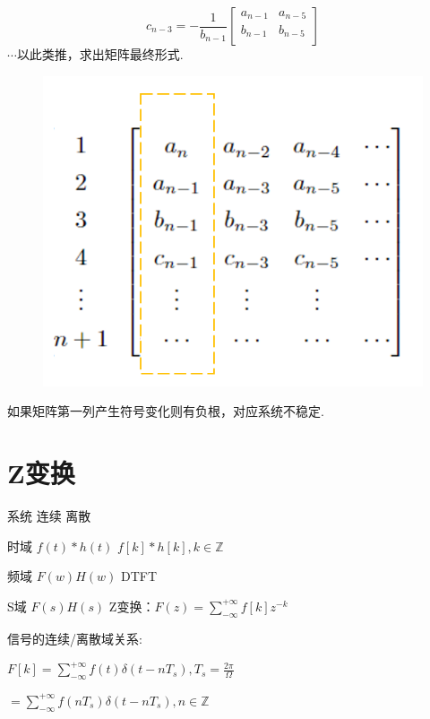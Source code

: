\documentclass[UTF8]{ctexart}
\begin{document}
\[c_{n-3}=-\frac{1}{b_{n-1}} \left[   
                \begin{matrix}
                a_{n-1} & a_{n-5} \\
                b_{n-1} & b_{n-5} \\
                \end{matrix}
                 \right]  \]
\qquad $\cdots $以此类推，求出矩阵最终形式.\par
\begin{figure}[h]
    \centering         %
    \includegraphics[scale=0.5]{2.png}
\end{figure}
如果矩阵第一列产生符号变化则有负根，对应系统不稳定.\par

\section{Z变换}
系统 \qquad 连续 \qquad  \qquad \qquad 离散 \par
时域 \qquad $f(t)\ast h(t)$ \qquad $f[k]\ast h[k],k\in \mathbb{Z}$  \par
频域 \qquad $F(w)H(w)$ \qquad DTFT \par
S域 \qquad $F(s)H(s)$ \qquad Z变换：$F(z)=\sum_{-\infty }^{+\infty} f[k]z^{-k} $ \par
信号的连续/离散域关系: \par
$F[k]=\sum_{-\infty }^{+\infty} f(t)\delta (t-nT_s),T_s=\frac{2\pi}{\Omega }  $  \par
\qquad $=\sum_{-\infty }^{+\infty} f(nT_s)\delta (t-nT_s), n\in \mathbb{Z} $  \par
\end{document}
